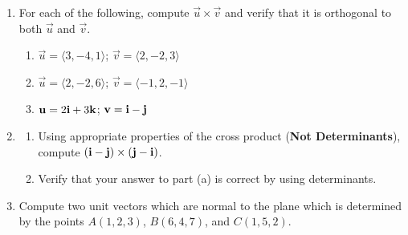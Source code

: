 \documentclass[12pt]{article}
\newif\ifans
\begin{document}
\begin{enumerate}

\item For each of the following, compute $\overrightarrow{u}\times\overrightarrow{v}$ and verify that it is orthogonal to both $\overrightarrow{u}$ and $\overrightarrow{v}$.

\begin{enumerate}

\item $\overrightarrow{u}=\langle 3,-4,1 \rangle$; $\overrightarrow{v}=\langle 2,-2,3 \rangle$

\ifans{\fbox{$\langle -10,-7,2\rangle$}} \fi

\item $\overrightarrow{u}=\langle 2,-2,6 \rangle$; $\overrightarrow{v}=\langle -1,2,-1 \rangle$

\ifans{\fbox{$\langle -10,-4,2\rangle$}} \fi

\item ${\bf u}=2{\bf i}+3{\bf k}$; ${\bf v}={\bf i}-{\bf j}$

\ifans{\fbox{$\langle 3,3,-2\rangle$}} \fi

\end{enumerate}

\item \begin{enumerate}

\item Using appropriate properties of the cross product ({\bf Not Determinants}), compute $({\bf i}-{\bf j})\times({\bf j}-{\bf i})$.

\ifans{\fbox{${\bf 0}$; Detailed Solution: \textcolor{blue}{\href{http://www.math.drexel.edu/classes/Calculus/resources/Math200HW/Solutions/04_200_Cross_Product_02.pdf}{Here}} }} \fi

\item Verify that your answer to part (a) is correct by using determinants.

\ifans{\fbox{${\bf 0}$; Detailed Solution: \textcolor{blue}{\href{http://www.math.drexel.edu/classes/Calculus/resources/Math200HW/Solutions/04_200_Cross_Product_02.pdf}{Here}} }} \fi

\end{enumerate}

\item Compute two unit vectors which are normal to the plane which is determined by the points $A(1,2,3)$, $B(6,4,7)$, and $C(1,5,2)$.

\ifans{\fbox{$\overrightarrow{u_{1,2}}=\pm\frac{1}{\sqrt{446}}\langle -14,5,15 \rangle$}} \fi


\end{enumerate}
\end{document}
